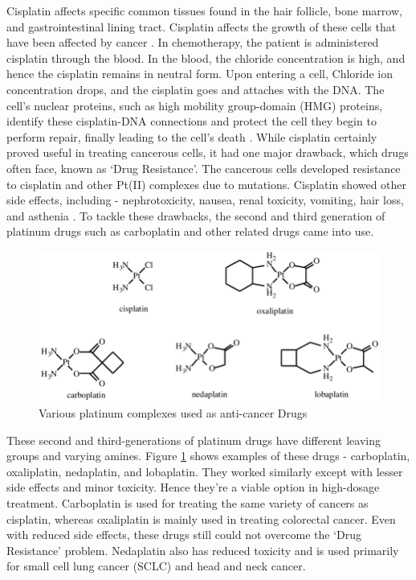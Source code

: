 \hspace{0.1cm}Cisplatin affects specific common tissues found in the hair follicle, bone marrow, and gastrointestinal lining tract. Cisplatin affects the growth of these cells that have been affected by cancer \cite{rafique2010transition}. In chemotherapy, the patient is administered cisplatin through the blood. In the blood, the chloride concentration is high, and hence the cisplatin remains in neutral form. Upon entering a cell, Chloride ion concentration drops, and the cisplatin goes and attaches with the DNA. The cell's nuclear proteins, such as high mobility group-domain (HMG) proteins, identify these cisplatin-DNA connections and protect the cell they begin to perform repair, finally leading to the cell's death \cite{shaili2014platinum}. While cisplatin certainly proved useful in treating cancerous cells, it had one major drawback, which drugs often face, known as `Drug Resistance'. The cancerous cells developed resistance to cisplatin and other Pt(II) complexes due to mutations. Cisplatin showed other side effects, including - nephrotoxicity, nausea, renal toxicity, vomiting, hair loss, and asthenia \cite{boulikas2007molecular}. To tackle these drawbacks, the second and third generation of platinum drugs such as carboplatin and other related drugs came into use.

\begin{figure}[!ht]
    \centering
    \includegraphics[scale = 0.55]{cisplatin.png}
    \caption{Various platinum complexes used as anti-cancer Drugs}
    \label{fig:cisplatin}
\end{figure}

\hspace{0.1cm}These second and third-generations of platinum drugs have different leaving groups and varying amines\cite{shaili2014platinum}. Figure \ref{fig:cisplatin} shows examples of these drugs - carboplatin, oxaliplatin, nedaplatin, and lobaplatin. They worked similarly except with lesser side effects and minor toxicity. Hence they're a viable option in high-dosage treatment. Carboplatin is used for treating the same variety of cancers as cisplatin, whereas oxaliplatin is mainly used in treating colorectal cancer\cite{kelland2007resurgence}. Even with reduced side effects, these drugs still could not overcome the `Drug Resistance' problem. Nedaplatin also has reduced toxicity and is used primarily for small cell lung cancer (SCLC) and head and neck cancer\cite{dilruba2016platinum}. 

